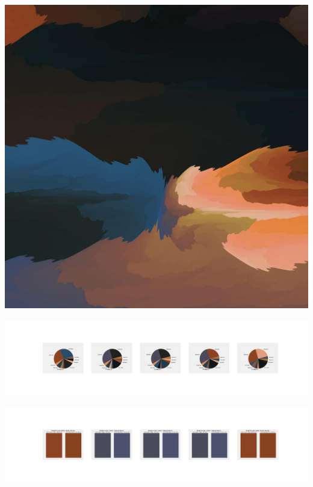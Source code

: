 \documentclass[11pt]{article}
\begin{document}
\begin{landscape}
    \begin{center}
    \includegraphics[width=\textwidth]{./nbimg/file (283).jpg}
    \end{center}

    \begin{center}
    \includegraphics[width=250mm]{./nbimg/pie-204.jpg}
    \end{center}

    \begin{center}
    \includegraphics[width=250mm]{./nbimg/peak-204.jpg}
    \end{center}
    


\end{landscape}
\end{document}
